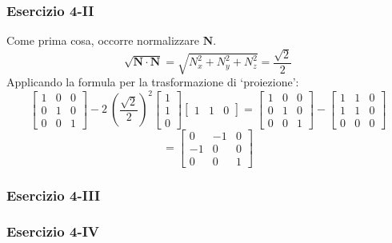 \documentclass{beamer}
\newcommand{\fig}{figures}
\begin{document}
\begin{frame}
\frametitle {Esercizio 4-II}
Come prima cosa, occorre normalizzare $\textbf{N}$.
\begin{displaymath}
\sqrt{\mathbf{N} \cdot \mathbf{N}} =\sqrt{ N_x^2+N_y^2+N_z^2}=\frac{\sqrt{2}}{2}
\end{displaymath}
Applicando la formula per la trasformazione di `proiezione':
\begin{displaymath}
\begin{bmatrix}
1 & 0 & 0 \\
0 & 1 & 0 \\ 
0 & 0 & 1 
\end{bmatrix}
- 2~ \left(\frac{\sqrt{2}}{2}\right)^2
\begin{bmatrix}
1 \\
1 \\ 
0 
\end{bmatrix}
\begin{bmatrix}
1 & 1 &  0
\end{bmatrix}
= 
\begin{bmatrix}
1 & 0 & 0 \\
0 & 1 & 0 \\ 
0 & 0 & 1 
\end{bmatrix}
-
\begin{bmatrix}
1 & 1 & 0 \\
1 & 1 & 0 \\ 
0 & 0 & 0 
\end{bmatrix}
\end{displaymath}
{\color[rgb]{0.1,0,1}
\begin{displaymath}
=
\begin{bmatrix}
0  & -1 & 0 \\
-1 &  0 & 0 \\ 
0  &  0 & 1 
\end{bmatrix}
\end{displaymath}
}

\end{frame}
\begin{frame}
\frametitle{Esercizio 4-III}
\begin{center}
\end{center}
\end{frame}
\begin{frame}
\frametitle{Esercizio 4-IV}
\begin{center}
\end{center}
\end{frame}
\end{document}
